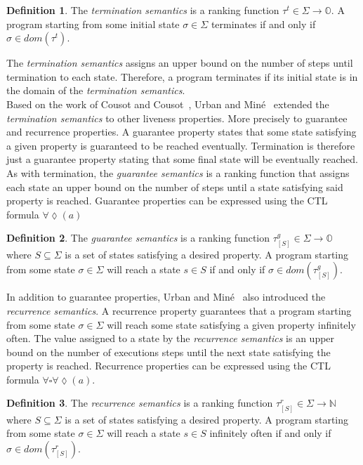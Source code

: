 \documentclass[11pt,a4paper,titlepage]{article}
\theoremstyle{definition}
\newtheorem{definition}{Definition}[section]
\begin{document}
\begin{definition}
    The \textit{termination semantics} is a ranking function 
    $\tau^{t} \in \Sigma \rightarrow \mathbb{O}$.
    A program starting from some initial state $\sigma \in \Sigma$ terminates if and only if $\sigma \in dom(\tau^{t})$.
\end{definition}

The \textit{termination semantics} assigns an upper bound on the number of steps until termination to each state. 
Therefore, a program terminates if its initial state is in the domain of the \textit{termination semantics}.\\

Based on the work of Cousot and Cousot~\cite{CousotCousot-POPL12}, Urban and Miné~\cite{UrbanM-VMCAI15} extended the 
\textit{termination semantics} to other liveness properties. More precisely to guarantee and recurrence properties. 
A guarantee property states that some state satisfying a given property is guaranteed to be reached eventually. 
Termination is therefore just a guarantee property stating that some final state will be eventually reached. 
As with termination, the \textit{guarantee semantics} is a ranking function that assigns each state an upper bound on the number of steps
until a state satisfying said property is reached. Guarantee properties can be expressed using the CTL formula $\forall\lozenge(a)$

\begin{definition}
    The \textit{guarantee semantics} is a ranking function 
    $\tau_{[S]}^{g} \in \Sigma \rightarrow \mathbb{O}$
    where $S \subseteq \Sigma$ is a set of states satisfying a desired property.
    A program starting from some state $\sigma \in \Sigma$ will reach a state 
    $s \in S$ if and only if $\sigma \in dom(\tau_{[S]}^{g})$.
\end{definition}

In addition to guarantee properties, Urban and Miné~\cite{UrbanM-VMCAI15} also introduced the \textit{recurrence semantics}.
A recurrence property guarantees that a program starting from some state $\sigma \in \Sigma$ will reach some state satisfying
a given property infinitely often. The value assigned to a state by the \textit{recurrence semantics}
is an upper bound on the number of executions steps until the next state satisfying the property is reached. 
Recurrence properties can be expressed using the CTL formula $\forall\square\forall\lozenge(a)$.

\begin{definition}
    The \textit{recurrence semantics} is a ranking function 
    $\tau_{[S]}^{r} \in \Sigma \rightarrow \mathbb{N}$
    where $S \subseteq \Sigma$ is a set of states satisfying a desired property.
    A program starting from some state $\sigma \in \Sigma$ will reach a state 
    $s \in S$ infinitely often if and only if $\sigma \in dom(\tau_{[S]}^{r})$.
\end{definition}
\end{document}
